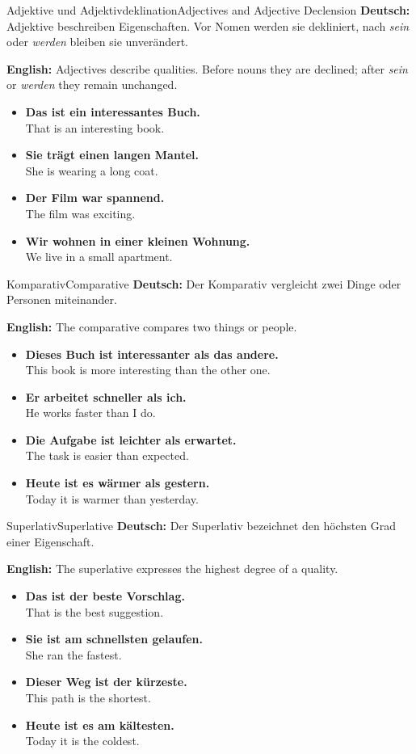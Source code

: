 \documentclass[a4paper,11pt]{article}
\newcommand{\GermanText}[1]{\textbf{Deutsch: }#1\par}
\newcommand{\EnglishText}[1]{{\color{SoftGray}\textbf{English: }#1\par}}
\newcommand{\ExampleItem}[2]{\item \textbf{#1}\\{\color{SoftGray}#2}}
\begin{document}
\begin{grammarentry}{Adjektive und Adjektivdeklination}{Adjectives and Adjective Declension}
    \GermanText{Adjektive beschreiben Eigenschaften. Vor Nomen werden sie dekliniert, nach \textit{sein} oder \textit{werden} bleiben sie unverändert.}
    \EnglishText{Adjectives describe qualities. Before nouns they are declined; after \textit{sein} or \textit{werden} they remain unchanged.}
    \begin{exbox}
        \begin{itemize}
            \ExampleItem{Das ist ein interessantes Buch.}{That is an interesting book.}
            \ExampleItem{Sie trägt einen langen Mantel.}{She is wearing a long coat.}
            \ExampleItem{Der Film war spannend.}{The film was exciting.}
            \ExampleItem{Wir wohnen in einer kleinen Wohnung.}{We live in a small apartment.}
        \end{itemize}
    \end{exbox}
\end{grammarentry}

\begin{grammarentry}{Komparativ}{Comparative}
    \GermanText{Der Komparativ vergleicht zwei Dinge oder Personen miteinander.}
    \EnglishText{The comparative compares two things or people.}
    \begin{exbox}
        \begin{itemize}
            \ExampleItem{Dieses Buch ist interessanter als das andere.}{This book is more interesting than the other one.}
            \ExampleItem{Er arbeitet schneller als ich.}{He works faster than I do.}
            \ExampleItem{Die Aufgabe ist leichter als erwartet.}{The task is easier than expected.}
            \ExampleItem{Heute ist es wärmer als gestern.}{Today it is warmer than yesterday.}
        \end{itemize}
    \end{exbox}
\end{grammarentry}

\begin{grammarentry}{Superlativ}{Superlative}
    \GermanText{Der Superlativ bezeichnet den höchsten Grad einer Eigenschaft.}
    \EnglishText{The superlative expresses the highest degree of a quality.}
    \begin{exbox}
        \begin{itemize}
            \ExampleItem{Das ist der beste Vorschlag.}{That is the best suggestion.}
            \ExampleItem{Sie ist am schnellsten gelaufen.}{She ran the fastest.}
            \ExampleItem{Dieser Weg ist der kürzeste.}{This path is the shortest.}
            \ExampleItem{Heute ist es am kältesten.}{Today it is the coldest.}
        \end{itemize}
    \end{exbox}
\end{grammarentry}
\end{document}
